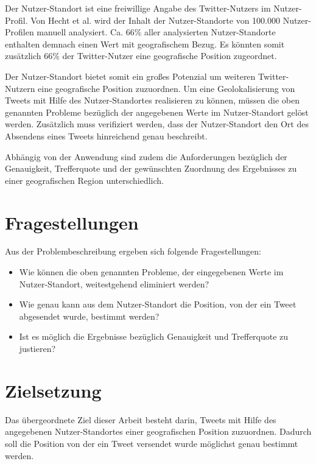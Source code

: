 		Der Nutzer-Standort ist eine freiwillige Angabe des Twitter-Nutzers im Nutzer-Profil. 
		Von Hecht et al. \cite{Hecht2011} wird der Inhalt der Nutzer-Standorte von 100.000 Nutzer-Profilen manuell analysiert.
	    Ca. 66\% aller analysierten Nutzer-Standorte enthalten demnach einen Wert mit geografischem Bezug.
	    Es könnten somit zusätzlich 66\% der Twitter-Nutzer eine geografische Position zugeordnet. 

	    Der Nutzer-Standort bietet somit ein großes Potenzial um weiteren Twitter-Nutzern eine geografische Position zuzuordnen.
	    Um eine Geolokalisierung von Tweets mit Hilfe des Nutzer-Standortes realisieren zu können, müssen die oben genannten Probleme bezüglich der angegebenen Werte im Nutzer-Standort gelöst werden.
	    Zusätzlich muss verifiziert werden, dass der Nutzer-Standort den Ort des Absendens eines Tweets hinreichend genau beschreibt.

	    Abhängig von der Anwendung sind zudem die Anforderungen bezüglich der Genauigkeit, Trefferquote und der gewünschten Zuordnung des Ergebnisses zu einer geografischen Region unterschiedlich. 
	    
	    
	    \newpage

	  \section{Fragestellungen}

	  	Aus der Problembeschreibung ergeben sich folgende Fragestellungen:  

	  	\begin{itemize}
	  		\item Wie können die oben genannten Probleme, der eingegebenen Werte im Nutzer-Standort, weitestgehend eliminiert werden?
	  		\item Wie genau kann aus dem Nutzer-Standort die Position, von der ein Tweet abgesendet wurde, bestimmt werden? 
			\item Ist es möglich die Ergebnisse bezüglich Genauigkeit und Trefferquote zu justieren?
	  	\end{itemize}
		
	\section{Zielsetzung} 

		Das übergeordnete Ziel dieser Arbeit besteht darin, Tweets mit Hilfe des angegebenen Nutzer-Standortes einer geografischen Position zuzuordnen.
		Dadurch soll die Position von der ein Tweet versendet wurde möglichst genau bestimmt werden.

